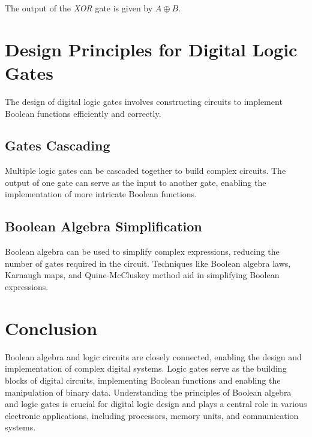 \documentclass{article}
\begin{document}
The output of the \textit{XOR} gate is given by $A \oplus B$.

\section{Design Principles for Digital Logic Gates}
The design of digital logic gates involves constructing circuits to implement Boolean functions efficiently and correctly.

\subsection{Gates Cascading}
Multiple logic gates can be cascaded together to build complex circuits. The output of one gate can serve as the input to another gate, enabling the implementation of more intricate Boolean functions.

\subsection{Boolean Algebra Simplification}
Boolean algebra can be used to simplify complex expressions, reducing the number of gates required in the circuit. Techniques like Boolean algebra laws, Karnaugh maps, and Quine-McCluskey method aid in simplifying Boolean expressions.

\section{Conclusion}
Boolean algebra and logic circuits are closely connected, enabling the design and implementation of complex digital systems. Logic gates serve as the building blocks of digital circuits, implementing Boolean functions and enabling the manipulation of binary data. Understanding the principles of Boolean algebra and logic gates is crucial for digital logic design and plays a central role in various electronic applications, including processors, memory units, and communication systems.
\end{document}
